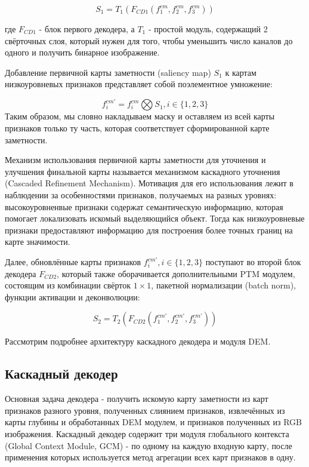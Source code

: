 \begin{equation}
    S_1 = T_1(F_{CD1}(f_1^{cm},f_2^{cm},f_3^{cm}))
\end{equation}

где $F_{CD1}$ - блок первого декодера, а $T_1$ - простой модуль, содержащий 2 свёрточных слоя, который
нужен для того, чтобы уменьшить число каналов до одного и получить бинарное изображение.

Добавление первичной карты заметности (saliency map) $S_1$ к картам низкоуровневых признаков представляет собой
поэлементное умножение:

\begin{equation}
    f_i^{cm'} = f_i^{cm} \bigotimes S_1, i \in \{1,2,3\}
\end{equation}
Таким образом, мы словно накладываем маску и оставляем из всей карты признаков только ту часть, которая соответствует
сформированной карте заметности.

Механизм использования первичной карты заметности для уточнения и улучшения финальной карты называется механизмом каскадного уточнения (Cascaded Refinement Mechanism).
Мотивация для его использования лежит в наблюдении за особенностями признаков, получаемых на разных уровнях: высокоуровненвые признаки содержат семантическую информацию,
которая помогает локализовать искомый выделяющийся объект. Тогда как низкоуровневые признаки предоставляют информацию для построения более точных границ на карте значимости.

Далее, обновлённые карты признаков $f_i^{cm'}, i \in \{1,2,3\} $ поступают во второй блок декодера $F_{CD2}$, который также оборачивается дополнительными PTM модулем,
состоящим из комбинации свёрток $1 \times 1$, пакетной нормализации (batch norm), функции активации и деконволюции:

\begin{equation}
    S_2 = T_2(F_{CD2}(f_1^{cm'},f_2^{cm'},f_3^{cm'}))
\end{equation}


Рассмотрим подробнее архитектуру каскадного декодера и модуля DEM.

\subsection{Каскадный декодер}
Основная задача декодера - получить искомую карту заметности из карт признаков разного уровня, полученных слиянием признаков,
извлечённых из карты глубины и обработанных DEM модулем, и признаков полученных из RGB изображения.
Каскадный декодер содержит три модуля глобального контекста (Global Context Module, GCM) - по одному на каждую входную карту, после применения которых
используется метод агрегации всех карт признаков в одну.

